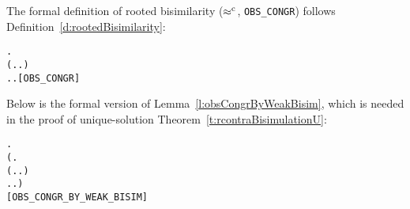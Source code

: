 The formal definition of rooted bisimilarity ($\mathrel{\approx^{\rm{c}}}$, \texttt{OBS_CONGR}) 
follows Definition~\ref{d:rootedBisimilarity}:
\begin{alltt}
 \HOLSymConst{\HOLTokenObsCongr}  \HOLSymConst{\HOLTokenDefEquality{}}
  \HOLSymConst{\HOLTokenForall{}}.
      (\HOLSymConst{\HOLTokenForall{}}.  \HOLTokenTransBegin{}\HOLTokenTransEnd {} \HOLSymConst{\HOLTokenImp{}} \HOLSymConst{\HOLTokenExists{}}.  \HOLTokenWeakTransBegin{}\HOLTokenImp{}  \HOLSymConst{\HOLTokenConj{}}  \HOLSymConst{\HOLTokenWeakEQ} ) \HOLSymConst{\HOLTokenConj{}}
      \HOLSymConst{\HOLTokenForall{}}.  \HOLTokenTransBegin{}\HOLTokenTransEnd {} \HOLSymConst{\HOLTokenImp{}} \HOLSymConst{\HOLTokenExists{}}.  \HOLTokenWeakTransBegin{}\HOLTokenImp{}  \HOLSymConst{\HOLTokenConj{}}  \HOLSymConst{\HOLTokenWeakEQ} \hfill{[OBS_CONGR]}
\end{alltt}
Below is the formal version of Lemma~\ref{l:obsCongrByWeakBisim}, which is needed in the proof
of unique-solution Theorem~\ref{t:rcontraBisimulationU}:
\begin{alltt}
\HOLTokenTurnstile{}   \HOLSymConst{\HOLTokenImp{}}
   \HOLSymConst{\HOLTokenForall{}} .
       (\HOLSymConst{\HOLTokenForall{}}.
            (\HOLSymConst{\HOLTokenForall{}}.  \HOLTokenTransBegin{}\HOLTokenTransEnd {} \HOLSymConst{\HOLTokenImp{}} \HOLSymConst{\HOLTokenExists{}}.  \HOLTokenWeakTransBegin{}\HOLTokenImp{}  \HOLSymConst{\HOLTokenConj{}}   ) \HOLSymConst{\HOLTokenConj{}}
            \HOLSymConst{\HOLTokenForall{}}.  \HOLTokenTransBegin{}\HOLTokenTransEnd {} \HOLSymConst{\HOLTokenImp{}} \HOLSymConst{\HOLTokenExists{}}.  \HOLTokenWeakTransBegin{}\HOLTokenImp{}  \HOLSymConst{\HOLTokenConj{}}   ) \HOLSymConst{\HOLTokenImp{}}
        \HOLSymConst{\HOLTokenObsCongr} \hfill{[OBS_CONGR_BY_WEAK_BISIM]}
\end{alltt}

